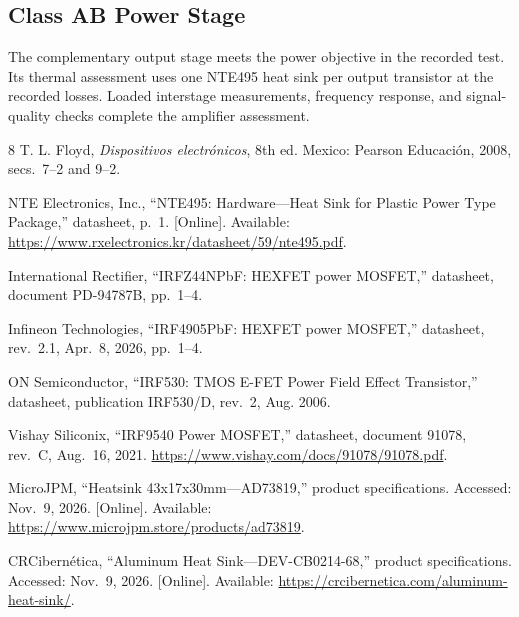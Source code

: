 \documentclass[conference,letterpaper]{IEEEtran}
\begin{document}
\subsection{Class AB Power Stage}
The complementary output stage meets the power objective in the
recorded test. Its thermal assessment uses one NTE495 heat sink per
output transistor at the recorded losses. Loaded interstage measurements,
frequency response, and signal-quality checks complete the amplifier
assessment.
\begin{thebibliography}{8}
T. L. Floyd, \emph{Dispositivos electrónicos}, 8th ed.
Mexico: Pearson Educación, 2008, secs.~7--2 and 9--2.

NTE Electronics, Inc., ``NTE495: Hardware---Heat Sink for Plastic
Power Type Package,'' datasheet, p.~1. [Online]. Available:
\url{https://www.rxelectronics.kr/datasheet/59/nte495.pdf}.

International Rectifier, ``IRFZ44NPbF: HEXFET power MOSFET,''
datasheet, document PD-94787B, pp.~1--4.

Infineon Technologies, ``IRF4905PbF: HEXFET power MOSFET,''
datasheet, rev.~2.1, Apr.~8, 2026, pp.~1--4.

ON Semiconductor, ``IRF530: TMOS E-FET Power Field Effect Transistor,''
datasheet, publication IRF530/D, rev.~2, Aug. 2006.

Vishay Siliconix, ``IRF9540 Power MOSFET,'' datasheet, document 91078,
rev.~C, Aug.~16, 2021. \url{https://www.vishay.com/docs/91078/91078.pdf}.

MicroJPM, ``Heatsink 43x17x30mm---AD73819,'' product specifications.
Accessed: Nov.~9, 2026. [Online]. Available:
\url{https://www.microjpm.store/products/ad73819}.

CRCibern\'etica, ``Aluminum Heat Sink---DEV-CB0214-68,'' product
specifications. Accessed: Nov.~9, 2026. [Online]. Available:
\url{https://crcibernetica.com/aluminum-heat-sink/}.

\end{thebibliography}
\end{document}
